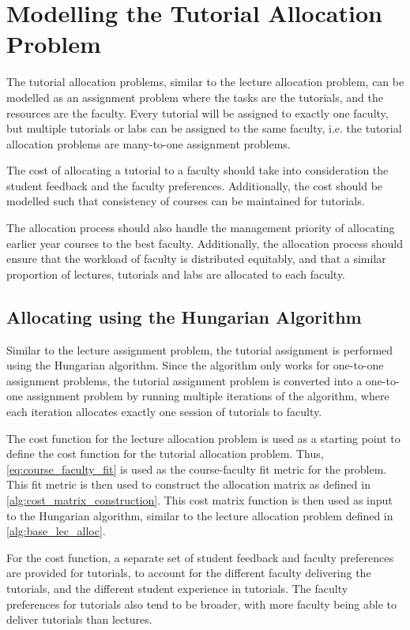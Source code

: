 \section{Modelling the Tutorial Allocation Problem}

The tutorial allocation problems, similar to the lecture allocation problem, can be modelled as an assignment problem where the tasks are the tutorials, and the resources are the faculty. Every tutorial will be assigned to exactly one faculty, but multiple tutorials or labs can be assigned to the same faculty, i.e. the tutorial allocation problems are many-to-one assignment problems.

The cost of allocating a tutorial to a faculty should take into consideration the student feedback and the faculty preferences. Additionally, the cost should be modelled such that consistency of courses can be maintained for tutorials.

The allocation process should also handle the management priority of allocating earlier year courses to the best faculty. Additionally, the allocation process should ensure that the workload of faculty is distributed equitably, and that a similar proportion of lectures, tutorials and labs are allocated to each faculty.

\subsection{Allocating using the Hungarian Algorithm}

Similar to the lecture assignment problem, the tutorial assignment is performed using the Hungarian algorithm. Since the algorithm only works for one-to-one assignment problems, the tutorial assignment problem is converted into a one-to-one assignment problem by running multiple iterations of the algorithm, where each iteration allocates exactly one session of tutorials to faculty.

The cost function for the lecture allocation problem is used as a starting point to define the cost function for the tutorial allocation problem. Thus, \autoref{eq:course_faculty_fit} is used as the course-faculty fit metric for the problem. This fit metric is then used to construct the allocation matrix as defined in \autoref{alg:cost_matrix_construction}. This cost matrix function is then used as input to the Hungarian algorithm, similar to the lecture allocation problem defined in \autoref{alg:base_lec_alloc}.

For the cost function, a separate set of student feedback and faculty preferences are provided for tutorials, to account for the different faculty delivering the tutorials, and the different student experience in tutorials. The faculty preferences for tutorials also tend to be broader, with more faculty being able to deliver tutorials than lectures.

